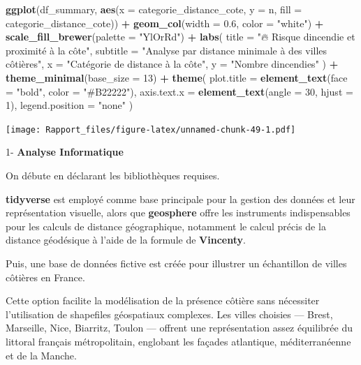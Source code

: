 \documentclass[
]{article}
\newenvironment{Shaded}{\begin{snugshade}}{\end{snugshade}}
\newcommand{\AttributeTok}[1]{\textcolor[rgb]{0.13,0.29,0.53}{#1}}
\newcommand{\DecValTok}[1]{\textcolor[rgb]{0.00,0.00,0.81}{#1}}
\newcommand{\FloatTok}[1]{\textcolor[rgb]{0.00,0.00,0.81}{#1}}
\newcommand{\FunctionTok}[1]{\textcolor[rgb]{0.13,0.29,0.53}{\textbf{#1}}}
\newcommand{\NormalTok}[1]{#1}
\newcommand{\SpecialCharTok}[1]{\textcolor[rgb]{0.81,0.36,0.00}{\textbf{#1}}}
\newcommand{\StringTok}[1]{\textcolor[rgb]{0.31,0.60,0.02}{#1}}
\begin{document}
\begin{Shaded}
\begin{Highlighting}[]
\FunctionTok{ggplot}\NormalTok{(df\_summary, }\FunctionTok{aes}\NormalTok{(}\AttributeTok{x =}\NormalTok{ categorie\_distance\_cote, }\AttributeTok{y =}\NormalTok{ n, }\AttributeTok{fill =}\NormalTok{ categorie\_distance\_cote)) }\SpecialCharTok{+}
  \FunctionTok{geom\_col}\NormalTok{(}\AttributeTok{width =} \FloatTok{0.6}\NormalTok{, }\AttributeTok{color =} \StringTok{"white"}\NormalTok{) }\SpecialCharTok{+}
  \FunctionTok{scale\_fill\_brewer}\NormalTok{(}\AttributeTok{palette =} \StringTok{"YlOrRd"}\NormalTok{) }\SpecialCharTok{+}
  \FunctionTok{labs}\NormalTok{(}
    \AttributeTok{title =} \StringTok{"🔥 Risque d\textquotesingle{}incendie et proximité à la côte"}\NormalTok{,}
    \AttributeTok{subtitle =} \StringTok{"Analyse par distance minimale à des villes côtières"}\NormalTok{,}
    \AttributeTok{x =} \StringTok{"Catégorie de distance à la côte"}\NormalTok{,}
    \AttributeTok{y =} \StringTok{"Nombre d\textquotesingle{}incendies"}
\NormalTok{  ) }\SpecialCharTok{+}
  \FunctionTok{theme\_minimal}\NormalTok{(}\AttributeTok{base\_size =} \DecValTok{13}\NormalTok{) }\SpecialCharTok{+}
  \FunctionTok{theme}\NormalTok{(}
    \AttributeTok{plot.title =} \FunctionTok{element\_text}\NormalTok{(}\AttributeTok{face =} \StringTok{"bold"}\NormalTok{, }\AttributeTok{color =} \StringTok{"\#B22222"}\NormalTok{),}
    \AttributeTok{axis.text.x =} \FunctionTok{element\_text}\NormalTok{(}\AttributeTok{angle =} \DecValTok{30}\NormalTok{, }\AttributeTok{hjust =} \DecValTok{1}\NormalTok{),}
    \AttributeTok{legend.position =} \StringTok{"none"}
\NormalTok{  )}
\end{Highlighting}
\end{Shaded}

\texttt{[image: Rapport\_files/figure-latex/unnamed-chunk-49-1.pdf]}

1- \textbf{Analyse Informatique}

On débute en déclarant les bibliothèques requises.

\textbf{tidyverse} est employé comme base principale pour la gestion des
données et leur représentation visuelle, alors que \textbf{geosphere}
offre les instruments indispensables pour les calculs de distance
géographique, notamment le calcul précis de la distance géodésique à
l'aide de la formule de \textbf{Vincenty}.

Puis, une base de données fictive est créée pour illustrer un
échantillon de villes côtières en France.

Cette option facilite la modélisation de la présence côtière sans
nécessiter l'utilisation de shapefiles géospatiaux complexes. Les villes
choisies --- Brest, Marseille, Nice, Biarritz, Toulon --- offrent une
représentation assez équilibrée du littoral français métropolitain,
englobant les façades atlantique, méditerranéenne et de la Manche.
\end{document}
